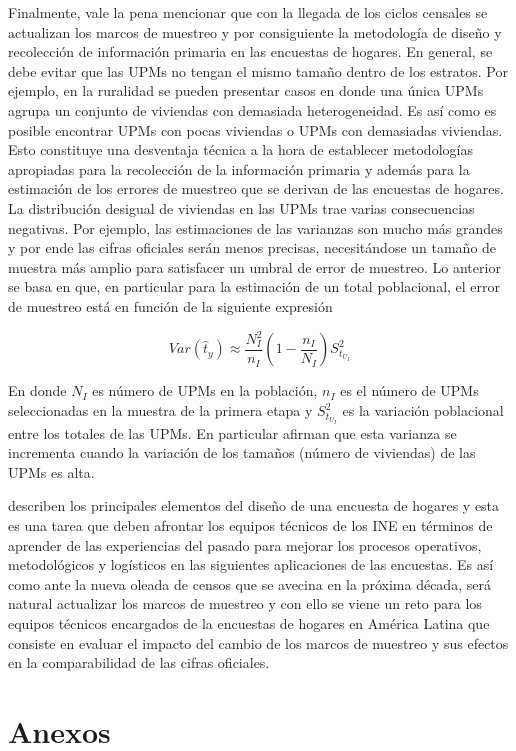 \documentclass[12pt,spanish,]{book}
\begin{document}
Finalmente, vale la pena mencionar que con la llegada de los ciclos censales se actualizan los marcos de muestreo y por consiguiente la metodología de diseño y recolección de información primaria en las encuestas de hogares. En general, se debe evitar que las UPMs no tengan el mismo tamaño dentro de los estratos. Por ejemplo, en la ruralidad se pueden presentar casos en donde una única UPMs agrupa un conjunto de viviendas con demasiada heterogeneidad. Es así como es posible encontrar UPMs con pocas viviendas o UPMs con demasiadas viviendas. Esto constituye una desventaja técnica a la hora de establecer metodologías apropiadas para la recolección de la información primaria y además para la estimación de los errores de muestreo que se derivan de las encuestas de hogares. La distribución desigual de viviendas en las UPMs trae varias consecuencias negativas. Por ejemplo, las estimaciones de las varianzas son mucho más grandes y por ende las cifras oficiales serán menos precisas, necesitándose un tamaño de muestra más amplio para satisfacer un umbral de error de muestreo. Lo anterior se basa en que, en particular para la estimación de un total poblacional, el error de muestreo está en función de la siguiente expresión

\[Var(\hat{t}_y) \approx \frac{N_I^2}{n_I}\left(1-\frac{n_I}{N_I}\right)S^2_{t_{U_I}} \]

En donde \(N_I\) es número de UPMs en la población, \(n_I\) es el número de UPMs seleccionadas en la muestra de la primera etapa y \(S^2_{t_{U_I}}\) es la variación poblacional entre los totales de las UPMs. En particular \textcite[pág. 144]{SSW_2003} afirman que esta varianza se incrementa cuando la variación de los tamaños (número de viviendas) de las UPMs es alta.

\textcite{Beland_Dale_Dufour_Hamel_2005} describen los principales elementos del diseño de una encuesta de hogares y esta es una tarea que deben afrontar los equipos técnicos de los INE en términos de aprender de las experiencias del pasado para mejorar los procesos operativos, metodológicos y logísticos en las siguientes aplicaciones de las encuestas. Es así como ante la nueva oleada de censos que se avecina en la próxima década, será natural actualizar los marcos de muestreo y con ello se viene un reto para los equipos técnicos encargados de la encuestas de hogares en América Latina que consiste en evaluar el impacto del cambio de los marcos de muestreo y sus efectos en la comparabilidad de las cifras oficiales.

\hypertarget{anexos}{%
\chapter*{Anexos}\label{anexos}}
\end{document}
